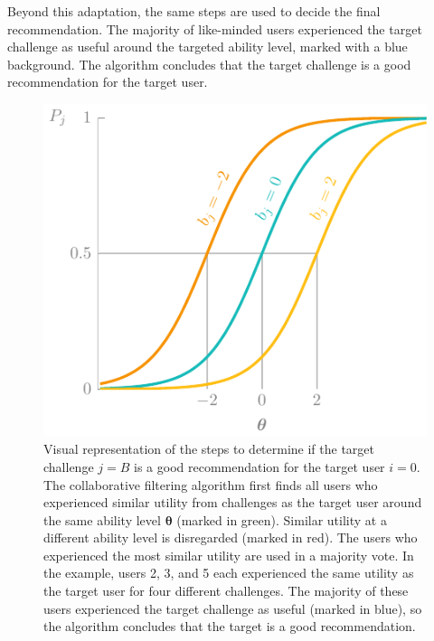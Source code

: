 Beyond this adaptation, the same steps are used to decide the final recommendation.
The majority of like-minded users experienced the target challenge as useful around the targeted ability level, marked with a blue background.
The algorithm concludes that the target challenge is a good recommendation for the target user.

\begin{figure}
    \centering
    \includegraphics[width=\textwidth,page=3]{03-education/figures/tikzfigures.pdf}
    \caption[Adapted collaborative filtering algorithm]{Visual representation of the steps to determine if the target challenge $j=B$ is a good recommendation for the target user $i=0$. 
    The collaborative filtering algorithm first finds all users who experienced similar utility from challenges as the target user around the same ability level $\bm\theta$ (marked in green). 
    Similar utility at a different ability level is disregarded (marked in red).
    The users who experienced the most similar utility are used in a majority vote. 
    In the example, users 2, 3, and 5 each experienced the same utility as the target user for four different challenges.
    The majority of these users experienced the target challenge as useful (marked in blue), so the algorithm concludes that the target is a good recommendation.}
    \label{fig:3d-cf}
\end{figure}

